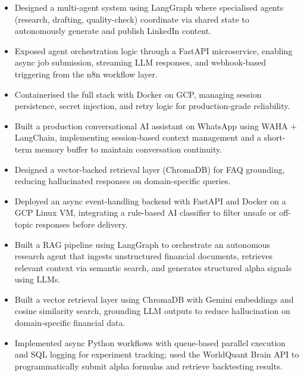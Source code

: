 \documentclass{resume}
\begin{document}
\begin{itemize}
  \item Designed a multi-agent system using LangGraph where specialised agents (research, drafting, quality-check) coordinate via shared state to autonomously generate and publish LinkedIn content.
  \item Exposed agent orchestration logic through a FastAPI microservice, enabling async job submission, streaming LLM responses, and webhook-based triggering from the n8n workflow layer.
  \item Containerised the full stack with Docker on GCP, managing session persistence, secret injection, and retry logic for production-grade reliability.
\end{itemize}

\begin{itemize}
  \item Built a production conversational AI assistant on WhatsApp using WAHA + LangChain, implementing session-based context management and a short-term memory buffer to maintain conversation continuity.
  \item Designed a vector-backed retrieval layer (ChromaDB) for FAQ grounding, reducing hallucinated responses on domain-specific queries.
  \item Deployed an async event-handling backend with FastAPI and Docker on a GCP Linux VM, integrating a rule-based AI classifier to filter unsafe or off-topic responses before delivery.
\end{itemize}

\begin{itemize}
  \item Built a RAG pipeline using LangGraph to orchestrate an autonomous research agent that ingests unstructured financial documents, retrieves relevant context via semantic search, and generates structured alpha signals using LLMs.
  \item Built a vector retrieval layer using ChromaDB with Gemini embeddings and cosine similarity search, grounding LLM outputs to reduce hallucination on domain-specific financial data.
  \item Implemented async Python workflows with queue-based parallel execution and SQL logging for experiment tracking; used the WorldQuant Brain API to programmatically submit alpha formulas and retrieve backtesting results.
\end{itemize}
\end{document}
